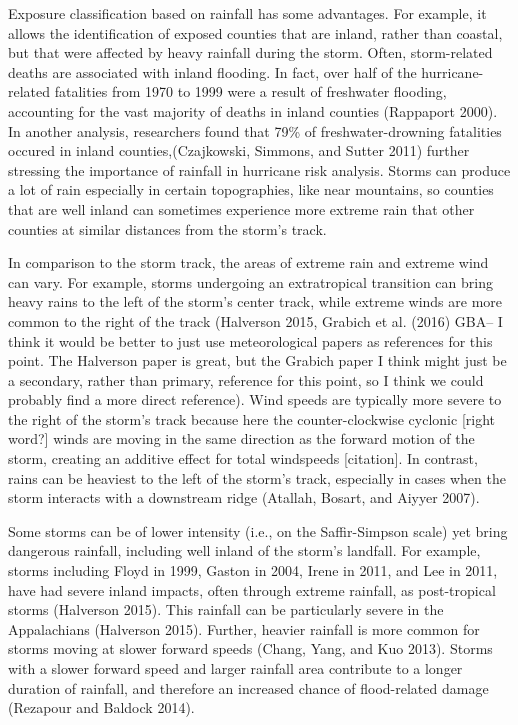 \documentclass[]{elsarticle} %
\begin{document}
Exposure classification based on rainfall has some advantages. For
example, it allows the identification of exposed counties that are
inland, rather than coastal, but that were affected by heavy rainfall
during the storm. Often, storm-related deaths are associated with inland
flooding. In fact, over half of the hurricane-related fatalities from
1970 to 1999 were a result of freshwater flooding, accounting for the
vast majority of deaths in inland counties (Rappaport 2000). In another
analysis, researchers found that 79\% of freshwater-drowning fatalities
occured in inland counties,(Czajkowski, Simmons, and Sutter 2011)
further stressing the importance of rainfall in hurricane risk analysis.
Storms can produce a lot of rain especially in certain topographies,
like near mountains, so counties that are well inland can sometimes
experience more extreme rain that other counties at similar distances
from the storm's track.

In comparison to the storm track, the areas of extreme rain and extreme
wind can vary. For example, storms undergoing an extratropical
transition can bring heavy rains to the left of the storm's center
track, while extreme winds are more common to the right of the track
(Halverson 2015, Grabich et al. (2016) GBA-- I think it would be better
to just use meteorological papers as references for this point. The
Halverson paper is great, but the Grabich paper I think might just be a
secondary, rather than primary, reference for this point, so I think we
could probably find a more direct reference). Wind speeds are typically
more severe to the right of the storm's track because here the
counter-clockwise cyclonic {[}right word?{]} winds are moving in the
same direction as the forward motion of the storm, creating an additive
effect for total windspeeds {[}citation{]}. In contrast, rains can be
heaviest to the left of the storm's track, especially in cases when the
storm interacts with a downstream ridge (Atallah, Bosart, and Aiyyer
2007).

Some storms can be of lower intensity (i.e., on the Saffir-Simpson
scale) yet bring dangerous rainfall, including well inland of the
storm's landfall. For example, storms including Floyd in 1999, Gaston in
2004, Irene in 2011, and Lee in 2011, have had severe inland impacts,
often through extreme rainfall, as post-tropical storms (Halverson
2015). This rainfall can be particularly severe in the Appalachians
(Halverson 2015). Further, heavier rainfall is more common for storms
moving at slower forward speeds (Chang, Yang, and Kuo 2013). Storms with
a slower forward speed and larger rainfall area contribute to a longer
duration of rainfall, and therefore an increased chance of flood-related
damage (Rezapour and Baldock 2014).
\end{document}
